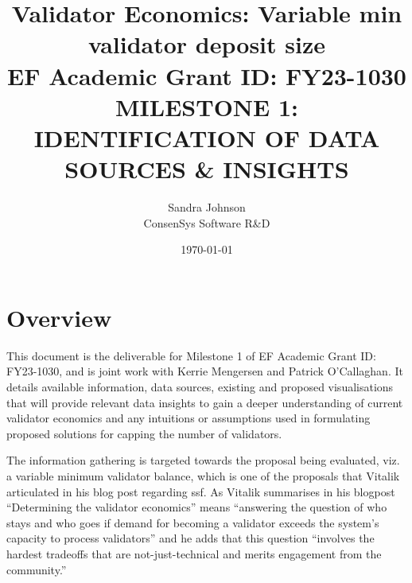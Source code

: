 \documentclass[UTF8]{article}
\title{Validator Economics: Variable min validator deposit size\\
\vspace{4pt}
\large EF Academic Grant ID: FY23-1030\\
\vspace{16pt}
MILESTONE 1: IDENTIFICATION OF DATA SOURCES \& INSIGHTS}
\author{Sandra Johnson\\
ConsenSys Software R\&D}
\date{\today}                                           %
\begin{document}
\maketitle



\section{Overview}
This document is the deliverable for Milestone 1 of EF Academic Grant ID: FY23-1030, and is joint work with Kerrie Mengersen and Patrick O'Callaghan. It details available information, data sources, existing and proposed visualisations that will provide relevant data insights to gain a deeper understanding of current validator economics and any intuitions or assumptions used in formulating proposed solutions for capping the number of validators.

The information gathering is targeted towards the proposal being evaluated, viz. a variable minimum validator balance, which is one of the proposals that Vitalik articulated in his blog post regarding \gls{ssf}.  As Vitalik summarises in his blogpost ``Determining the validator economics'' means ``answering the question of who stays and who goes if demand for becoming a validator exceeds the system's capacity to process validators'' and he adds that this question ``involves the hardest tradeoffs that are not-just-technical and merits engagement from the community.''
\end{document}
